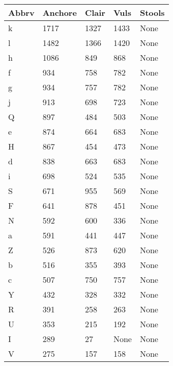 \begin{center}
\tabulinesep=1.2mm
        \begin{longtable} {| p{} | p{} | p{} | p{} | p{} |}
 \hline
		\textbf{Abbrv}  &    \textbf{Anchore}   &   \textbf{Clair}  &   \textbf{Vuls}   &   \textbf{Stools}    \\   
\hline
k  &    1717   &   1327  &   1433   &   None    \\   
\hline
l  &    1482   &   1366  &   1420   &   None    \\   
\hline
h  &    1086   &   849  &   868   &   None    \\   
\hline
f  &    934   &   758  &   782   &   None    \\   
\hline
g  &    934   &   757  &   782   &   None    \\   
\hline
j  &    913   &   698  &   723   &   None    \\   
\hline
Q  &    897   &   484  &   503   &   None    \\   
\hline
e  &    874   &   664  &   683   &   None    \\   
\hline
H  &    867   &   454  &   473   &   None    \\   
\hline
d  &    838   &   663  &   683   &   None    \\   
\hline
i  &    698   &   524  &   535   &   None    \\   
\hline
S  &    671   &   955  &   569   &   None    \\   
\hline
F  &    641   &   878  &   451   &   None    \\   
\hline
N  &    592   &   600  &   336   &   None    \\   
\hline
a  &    591   &   441  &   447   &   None    \\   
\hline
Z  &    526   &   873  &   620   &   None    \\   
\hline
b  &    516   &   355  &   393   &   None    \\   
\hline
c  &    507   &   750  &   757   &   None    \\   
\hline
Y  &    432   &   328  &   332   &   None    \\   
\hline
R  &    391   &   258  &   263   &   None    \\   
\hline
U  &    353   &   215  &   192   &   None    \\   
\hline
I  &    289   &   27  &   None   &   None    \\   
\hline
V  &    275   &   157  &   158   &   None    \\   

\end{longtable}
\end{center}
